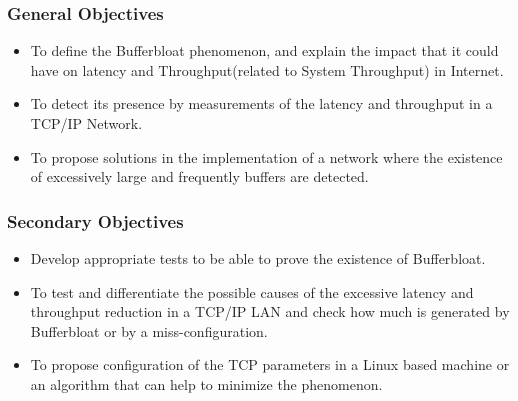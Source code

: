 \begin{frame}
	\frametitle{General Objectives}
	\begin{block}{}
		\begin{itemize}
			\item To define the Bufferbloat phenomenon, and explain the impact that it could have on latency and Throughput(related to System Throughput) in Internet.
		\end{itemize}
	\end{block}
	\begin{block}{}
		\begin{itemize}
		\item To detect its presence by measurements of the latency and throughput in a TCP/IP Network.
		\end{itemize}
	\end{block}
	\begin{block}{}
		\begin{itemize}
			\item To propose solutions in the implementation of a network where the existence of excessively large and frequently buffers are detected.
		\end{itemize}
	\end{block}
\end{frame}

\begin{frame}
	\frametitle{Secondary Objectives}
	\begin{block}{}
		\begin{itemize}
			\item Develop appropriate tests to be able to prove the existence of Bufferbloat.
		\end{itemize}
	\end{block}
	\begin{block}{}
		\begin{itemize}
			\item To test and differentiate the possible causes of the excessive latency and throughput reduction in a TCP/IP LAN and check how much is generated by Bufferbloat or by a miss-configuration.
		\end{itemize}
	\end{block}
	\begin{block}{}
		\begin{itemize}
			\item To propose configuration of the TCP parameters in a Linux based machine or an algorithm that can help to minimize the phenomenon.
		\end{itemize}
	\end{block}
\end{frame}
